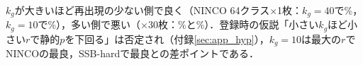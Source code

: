 $k_g$が大きいほど再出現の少ない側で良く（NINCO 64クラス$\times$1枚：$k_g{=}40$で\NKgNincoKgFourZeroROneMainFpr\%，$k_g{=}10$で\NKgNincoKgOneZeroROneMainFpr\%），多い側で悪い（$\times$30枚：\NKgNincoKgFourZeroRThreeZeroMainFpr\%と\NKgNincoKgOneZeroRThreeZeroMainFpr\%）．登録時の仮説「小さい$k_g$ほど小さい$r$で静的$p$を下回る」は否定され（付録\ref{sec:app_hyp}），$k_g{=}10$は最大の$r$でNINCOの最良，SSB-hardで最良との差\NKgSsbHardKgOneZeroMinusBestRmaxFpr{}ポイントである．

